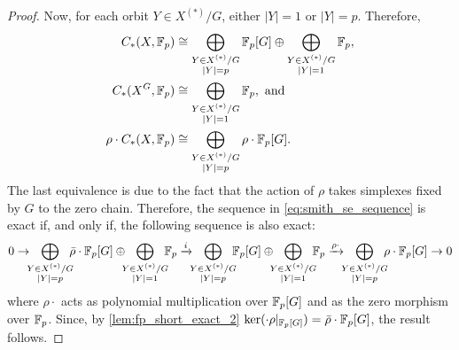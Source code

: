 \documentclass[a4paper,12pt]{amsart}
\begin{document}
\begin{proof}
    Now, for each orbit $Y\in X^{(*)}/G$, either $|Y| = 1$ or $|Y| = p$.
    Therefore,
    \begin{align*}
        C_*(X,\mathbb{F}_p) & \cong \bigoplus_{\substack{Y\in X^{(*)}/G \\ |Y| = p}} \mathbb{F}_p[G] \oplus \bigoplus_{\substack{Y\in X^{(*)}/G \\ |Y| = 1}} \mathbb{F}_p, \\
        C_*(X^G,\mathbb{F}_p) &\cong \bigoplus_{\substack{Y\in X^{(*)}/G \\ |Y| = 1}} \mathbb{F}_p,\text{ and} \\
        \rho \cdot C_*(X,\mathbb{F}_p) &\cong \bigoplus_{\substack{Y\in X^{(*)}/G \\ |Y| = p}} \rho \cdot \mathbb{F}_p[G].
    \end{align*}
    The last equivalence is due to the fact that the action of $\rho$ takes simplexes fixed by $G$ to the zero chain.
    Therefore, the sequence in \cref{eq:smith_se_sequence} is exact if, and only if, the following sequence is also exact:
    \begin{equation*}
      0\rightarrow \hspace{-5pt} \bigoplus_{\substack{Y\in X^{(*)}/G \\ |Y| = p}} \hspace{-5pt} \bar\rho\cdot\Fbb_p[G] \oplus \hspace{-5pt}\bigoplus_{\substack{Y\in X^{(*)}/G \\ |Y| = 1}} \hspace{-5pt} \Fbb_p \xrightarrow{i} \hspace{-5pt} \bigoplus_{\substack{Y\in X^{(*)}/G \\ |Y| = p}} \hspace{-5pt} \Fbb_p[G] \oplus \hspace{-5pt} \bigoplus_{\substack{Y\in X^{(*)}/G \\ |Y| = 1}} \hspace{-5pt} \Fbb_p \xrightarrow{\rho\cdot} \hspace{-5pt} \bigoplus_{\substack{Y\in X^{(*)}/G \\ |Y| = p}} \hspace{-5pt} \rho \cdot \Fbb_p[G]\rightarrow 0
      \end{equation*}
    where $\rho\cdot$ acts as polynomial multiplication over $\mathbb{F}_p[G]$ and as the zero morphism over $\mathbb{F}_p$.
    Since, by \cref{lem:fp_short_exact_2} $\ker(\cdot \rho|_{\mathbb{F}_p[G]}) = \bar\rho\cdot \mathbb{F}_p[G]$, the result follows.
\end{proof}
\end{document}
